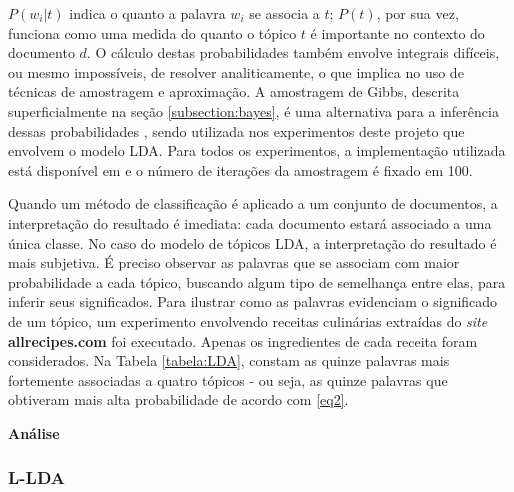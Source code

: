 \ensuremath{P(w_i | t)} indica o quanto a palavra \ensuremath{w_i} se associa a \ensuremath{t}; \ensuremath{P(t)}, por sua vez, funciona como uma medida do quanto o tópico \ensuremath{t} é importante no contexto do documento \ensuremath{d}. O cálculo destas probabilidades também envolve integrais difíceis, ou mesmo impossíveis, de resolver analiticamente, o que implica no uso de técnicas de amostragem e aproximação. A amostragem de Gibbs, descrita superficialmente na seção \ref{subsection:bayes}, é uma alternativa para a inferência dessas probabilidades \cite{lingpipe-lda}, sendo utilizada nos experimentos deste projeto que envolvem o modelo LDA. Para todos os experimentos, a implementação utilizada está disponível em \cite{top-lda} e o número de iterações da amostragem é fixado em 100.

Quando um método de classificação é aplicado a um conjunto de documentos, a interpretação do resultado é imediata: cada documento estará associado a uma única classe. No caso do modelo de tópicos LDA, a interpretação do resultado é mais subjetiva. É preciso observar as palavras que se associam com maior probabilidade a cada tópico, buscando algum tipo de semelhança entre elas, para inferir seus significados. Para ilustrar como as palavras evidenciam o significado de um tópico, um experimento envolvendo receitas culinárias extraídas do \emph{site} \textbf{allrecipes.com} foi executado. Apenas os ingredientes de cada receita foram considerados. Na Tabela \ref{tabela:LDA}, constam as quinze palavras mais fortemente associadas a quatro tópicos - ou seja, as quinze palavras que obtiveram mais alta probabilidade de acordo com \ref{eq2}.

\textbf{Análise}

\subsubsection{L-LDA}




